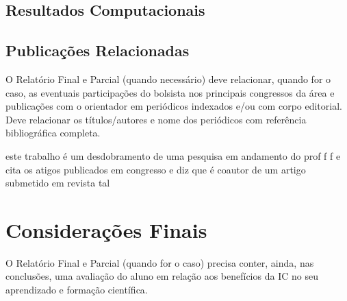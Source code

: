 \documentclass[a4paper,12pt]{report}
\theoremstyle{plain}
\theoremstyle{definition}
\begin{document}
	\section{Resultados Computacionais}
	
	\section{Publicações Relacionadas}
	O Relatório Final e Parcial (quando necessário) deve relacionar, quando for o caso, as eventuais participações do bolsista nos principais congressos da área e publicações com o orientador em periódicos indexados e/ou com corpo editorial. Deve relacionar os títulos/autores e nome dos periódicos com referência bibliográfica completa.

	este trabalho é um desdobramento de uma pesquisa em andamento do prof f f e cita os atigos publicados em congresso e diz que é coautor de um artigo submetido em revista tal
	
	\chapter{Considerações Finais}
	
	O Relatório Final e Parcial (quando for o caso) precisa conter, ainda, nas conclusões, uma avaliação do aluno em relação aos benefícios da IC no seu aprendizado e formação científica.
	
	
	
	
	
	
	\newpage
	\appendix
		
	
	
	
\end{document}
